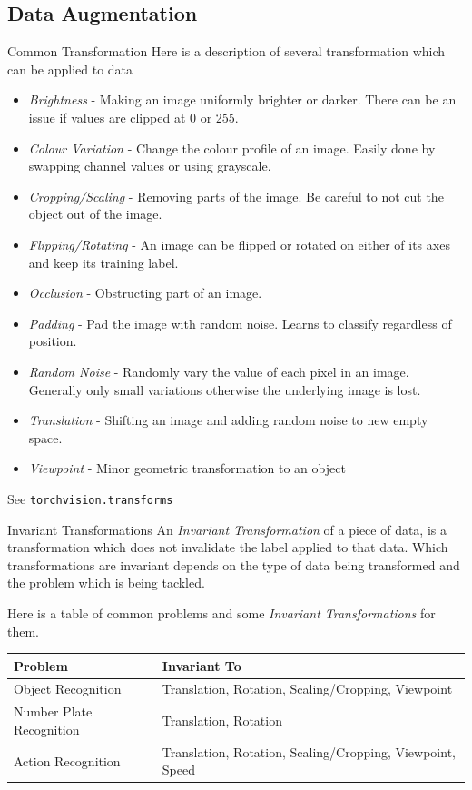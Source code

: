 \documentclass[11pt,a4paper]{article}
\begin{document}
\subsection{Data Augmentation} \label{sec_DataAugmentation}

  \begin{definition}{Common Transformation}
    Here is a description of several transformation which can be applied to data
    \begin{itemize}
      \item \textit{Brightness} - Making an image uniformly brighter or darker. There can be an issue if values are clipped at 0 or 255.
      \item \textit{Colour Variation} - Change the colour profile of an image. Easily done by swapping channel values or using grayscale.
      \item \textit{Cropping/Scaling} - Removing parts of the image. Be careful to not cut the object out of the image.
      \item \textit{Flipping/Rotating} - An image can be flipped or rotated on either of its axes and keep its training label.
      \item \textit{Occlusion} - Obstructing part of an image.
      \item \textit{Padding} - Pad the image with random noise. Learns to classify regardless of position.
      \item \textit{Random Noise} - Randomly vary the value of each pixel in an image. Generally only small variations otherwise the underlying image is lost.
      \item \textit{Translation} - Shifting an image and adding random noise to new empty space.
      \item \textit{Viewpoint} - Minor geometric transformation to an object
    \end{itemize}
    See \texttt{torchvision.transforms}
  \end{definition}

  \begin{definition}{Invariant Transformations}
    An \textit{Invariant Transformation} of a piece of data, is a transformation which does not invalidate the label applied to that data. Which transformations are invariant depends on the type of data being transformed and the problem which is being tackled.
    \par Here is a table of common problems and some \textit{Invariant Transformations} for them.
    \begin{center}
      \begin{tabular}{|l|l|}
        \hline
        \textbf{Problem}&\textbf{Invariant To}\\
        \hline
        Object Recognition& Translation, Rotation, Scaling/Cropping, Viewpoint\\
        Number Plate Recognition & Translation, Rotation\\
        Action Recognition & Translation, Rotation, Scaling/Cropping, Viewpoint, Speed\\
        \hline
      \end{tabular}
    \end{center}
  \end{definition}
\end{document}
